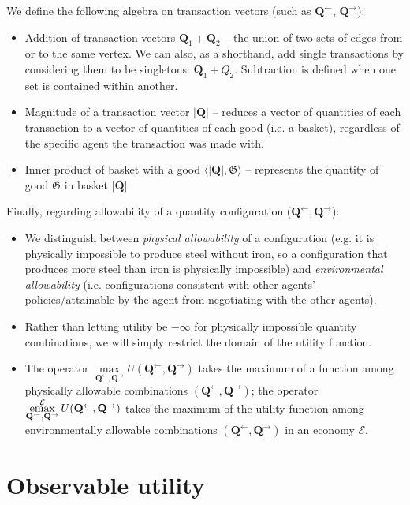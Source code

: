 \documentclass{journal}
\theoremstyle{plain}
\theoremstyle{definition}
\theoremstyle{remark}
\newcommand{\economy}{\ensuremath{\mathcal{E}}}
\newcommand{\emax}{\ensuremath{\operatornamewithlimits{emax}}}
\newcommand{\quants}{\ensuremath{Q}} %
\newcommand{\quantl}{\ensuremath{\mathbf{Q}}} %
\newcommand{\good}{\ensuremath{\mathfrak{G}}}
\newcommand{\utility}{\ensuremath{U}}
\begin{document}
We define the following algebra on transaction vectors (such as $\quantl^\leftarrow$, $\quantl^\rightarrow$):
\begin{itemize}
    \item Addition of transaction vectors $\quantl_1 + \quantl_2$ -- the union of two sets of edges from or to the same vertex. We can also, as a shorthand, add single transactions by considering them to be singletons: $\quantl_1+\quants_2$. Subtraction is defined when one set is contained within another.
    \item Magnitude of a transaction vector $|\quantl|$ -- reduces a vector of quantities of each transaction to a vector of quantities of each good (i.e. a basket), regardless of the specific agent the transaction was made with.
    \item Inner product of basket with a good $\langle |\quantl|, \good\rangle$ -- represents the quantity of good $\good$ in basket $|\quantl|$.
\end{itemize}

Finally, regarding allowability of a quantity configuration ($\quantl^\leftarrow, \quantl^\rightarrow$): 

\begin{itemize}
    \item We distinguish between \emph{physical allowability} of a configuration (e.g. it is physically impossible to produce steel without iron, so a configuration that produces more steel than iron is physically impossible) and \emph{environmental allowability} (i.e. configurations consistent with other agents' policies/attainable by the agent from negotiating with the other agents).
    \item Rather than letting utility be $-\infty$ for physically impossible quantity combinations, we will simply restrict the domain of the utility function. 
    \item The operator $\max\limits_{\quantl^\leftarrow, \quantl^\rightarrow} \utility(\quantl^\leftarrow, \quantl^\rightarrow)$ takes the maximum of a function among physically allowable combinations $(\quantl^\leftarrow, \quantl^\rightarrow)$; the operator $\emax\limits_{\quantl^\leftarrow, \quantl^\rightarrow}^\economy \utility(\quantl^\leftarrow, \quantl^\rightarrow)$ takes the maximum of the utility function among environmentally allowable combinations $(\quantl^\leftarrow, \quantl^\rightarrow)$ in an economy $\economy$.
\end{itemize} 

\section{Observable utility}
\label{sec:main}
\end{document}
